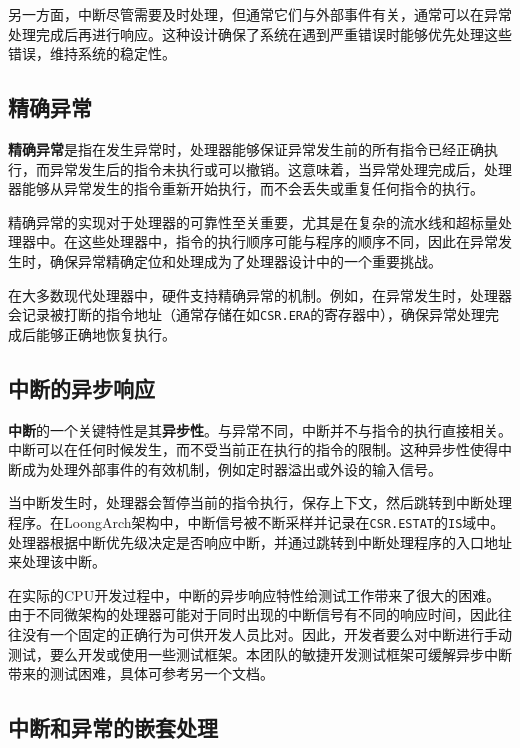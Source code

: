 另一方面，中断尽管需要及时处理，但通常它们与外部事件有关，通常可以在异常处理完成后再进行响应。这种设计确保了系统在遇到严重错误时能够优先处理这些错误，维持系统的稳定性。

\subsection{精确异常}\label{sec:07-exceptions-013}

\textbf{精确异常}是指在发生异常时，处理器能够保证异常发生前的所有指令已经正确执行，而异常发生后的指令未执行或可以撤销。这意味着，当异常处理完成后，处理器能够从异常发生的指令重新开始执行，而不会丢失或重复任何指令的执行。

精确异常的实现对于处理器的可靠性至关重要，尤其是在复杂的流水线和超标量处理器中。在这些处理器中，指令的执行顺序可能与程序的顺序不同，因此在异常发生时，确保异常精确定位和处理成为了处理器设计中的一个重要挑战。

在大多数现代处理器中，硬件支持精确异常的机制。例如，在异常发生时，处理器会记录被打断的指令地址（通常存储在如\texttt{CSR.ERA}的寄存器中），确保异常处理完成后能够正确地恢复执行。

\subsection{中断的异步响应}\label{sec:07-exceptions-014}

\textbf{中断}的一个关键特性是其\textbf{异步性}。与异常不同，中断并不与指令的执行直接相关。中断可以在任何时候发生，而不受当前正在执行的指令的限制。这种异步性使得中断成为处理外部事件的有效机制，例如定时器溢出或外设的输入信号。

当中断发生时，处理器会暂停当前的指令执行，保存上下文，然后跳转到中断处理程序。在LoongArch架构中，中断信号被不断采样并记录在\texttt{CSR.ESTAT}的\texttt{IS}域中。处理器根据中断优先级决定是否响应中断，并通过跳转到中断处理程序的入口地址来处理该中断。

在实际的CPU开发过程中，中断的异步响应特性给测试工作带来了很大的困难。由于不同微架构的处理器可能对于同时出现的中断信号有不同的响应时间，因此往往没有一个固定的正确行为可供开发人员比对。因此，开发者要么对中断进行手动测试，要么开发或使用一些测试框架。本团队的敏捷开发测试框架可缓解异步中断带来的测试困难，具体可参考另一个文档。

\subsection{中断和异常的嵌套处理}\label{sec:07-exceptions-015}


